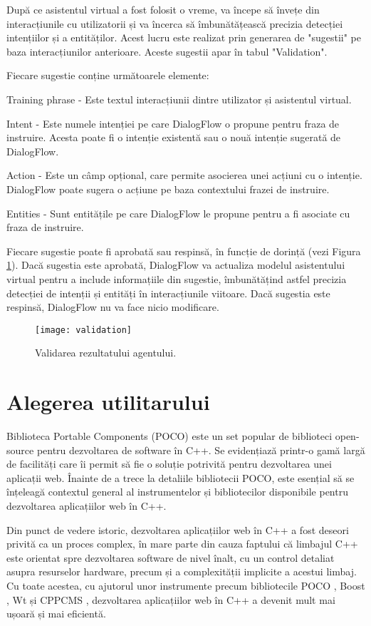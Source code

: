 După ce asistentul virtual a fost folosit o vreme, va începe să învețe din interacțiunile cu utilizatorii și va încerca să îmbunătățească precizia detecției intențiilor și a entităților. Acest lucru este realizat prin generarea de "sugestii" pe baza interacțiunilor anterioare. Aceste sugestii apar în tabul "Validation".

Fiecare sugestie conține următoarele elemente:

Training phrase - Este textul interacțiunii dintre utilizator și asistentul virtual.

Intent - Este numele intenției pe care DialogFlow o propune pentru fraza de instruire. Acesta poate fi o intenție existentă sau o nouă intenție sugerată de DialogFlow.

Action - Este un câmp opțional, care permite asocierea unei acțiuni cu o intenție. DialogFlow poate sugera o acțiune pe baza contextului frazei de instruire.

Entities - Sunt entitățile pe care DialogFlow le propune pentru a fi asociate cu fraza de instruire.

Fiecare sugestie poate fi aprobată sau respinsă, în funcție de dorință (vezi Figura \ref{fig:validation}). Dacă sugestia este aprobată, DialogFlow va actualiza modelul asistentului virtual pentru a include informațiile din sugestie, îmbunătățind astfel precizia detecției de intenții și entități în interacțiunile viitoare. Dacă sugestia este respinsă, DialogFlow nu va face nicio modificare.

\begin{figure}[h]
    \centering
    \texttt{[image: validation]}
    \caption{Validarea rezultatului agentului.}
    \label{fig:validation}
\end{figure}

\section{Alegerea utilitarului}

Biblioteca Portable Components (POCO) este un set popular de biblioteci open-source pentru dezvoltarea de software în C++. Se evidențiază printr-o gamă largă de facilități care îi permit să fie o soluție potrivită pentru dezvoltarea unei aplicații web. Înainte de a trece la detaliile bibliotecii POCO, este esențial să se înțeleagă contextul general al instrumentelor și bibliotecilor disponibile pentru dezvoltarea aplicațiilor web în C++.

Din punct de vedere istoric, dezvoltarea aplicațiilor web în C++ a fost deseori privită ca un proces complex, în mare parte din cauza faptului că limbajul C++ este orientat spre dezvoltarea software de nivel înalt, cu un control detaliat asupra resurselor hardware, precum și a complexității implicite a acestui limbaj. Cu toate acestea, cu ajutorul unor instrumente precum bibliotecile POCO \cite{poco-docs}, Boost \cite{boost-docs}, Wt \cite{wt-docs} și CPPCMS \cite{cppcms-docs}, dezvoltarea aplicațiilor web în C++ a devenit mult mai ușoară și mai eficientă.

